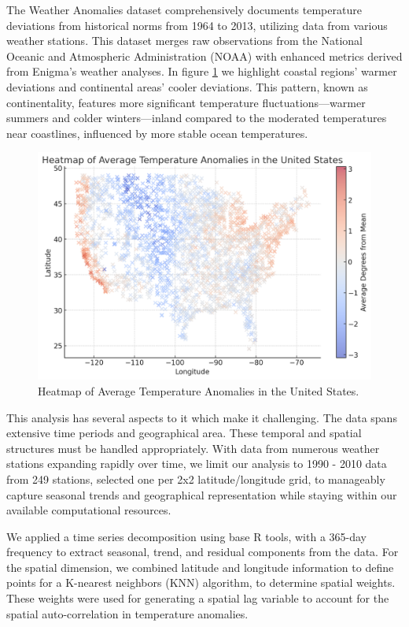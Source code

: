 \documentclass[12pt, twoside,hidelinks]{article}
\theoremstyle{definition}
\numberwithin{equation}{section}
\begin{document}
The Weather Anomalies dataset comprehensively documents temperature deviations from historical norms from 1964 to 2013, utilizing data from various weather stations. This dataset merges raw observations from the National Oceanic and Atmospheric Administration (NOAA) with enhanced metrics derived from Enigma's weather analyses. In figure \ref{fig:heatmap_usa} we highlight coastal regions' warmer deviations and continental areas' cooler deviations. This pattern, known as continentality, features more significant temperature fluctuations—warmer summers and colder winters—inland compared to the moderated temperatures near coastlines, influenced by more stable ocean temperatures.

\begin{figure}[H]
\centering
\includegraphics[width=\textwidth]{visuals/weather_visuals/Heat_map_USA.png}
\caption{Heatmap of Average Temperature Anomalies in the United States.}
\label{fig:heatmap_usa}
\end{figure}

This analysis has several aspects to it which make it challenging. The data spans extensive time periods and geographical area. These temporal and spatial structures must be handled appropriately. With data from numerous weather stations expanding rapidly over time, we limit our analysis to 1990 - 2010 data from 249 stations, selected one per 2x2 latitude/longitude grid, to manageably capture seasonal trends and geographical representation while staying within our available computational resources.

We applied a time series decomposition using base R tools, with a 365-day frequency to extract seasonal, trend, and residual components from the data. For the spatial dimension, we combined latitude and longitude information to define points for a K-nearest neighbors (KNN) algorithm, to determine spatial weights. These weights were used for generating a spatial lag variable to account for the spatial auto-correlation in temperature anomalies.
\end{document}
